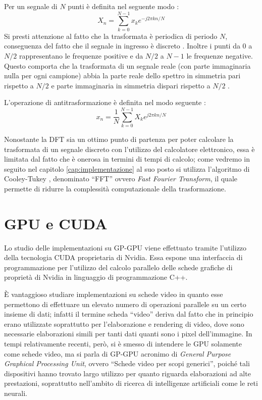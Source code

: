 Per un segnale di $N$ punti è definita nel seguente modo \cite[p.~2.50]{calandrino}:
\begin{equation}
    X_n = \displaystyle\sum_{k=0}^{N-1}x_k e^{-j 2\pi kn/N}
    \label{eq:dft}
\end{equation}
Si presti attenzione al fatto che la trasformata è periodica di periodo $N$, conseguenza del fatto che il segnale in ingresso è discreto \cite[p.~2.30]{calandrino}. Inoltre i punti da $0$ a $N/2$ rappresentano le frequenze positive e da $N/2$ a $N-1$ le frequenze negative. Questo comporta che la trasformata di un segnale reale (con parte immaginaria nulla per ogni campione) abbia la parte reale dello spettro in simmetria pari rispetto a $N/2$ e parte immaginaria in simmetria dispari rispetto a $N/2$ \cite[p.~570]{dspguide}.

L'operazione di antitrasformazione è definita nel modo seguente \cite[p.~2.50]{calandrino}:
\begin{equation}
    x_n = \frac{1}{N}\displaystyle\sum_{k=0}^{N-1}X_k e^{j 2\pi kn/N}
\end{equation}

Nonostante la DFT sia un ottimo punto di partenza per poter calcolare la trasformata di un segnale discreto con l'utilizzo del calcolatore elettronico, essa è limitata dal fatto che è onerosa in termini di tempi di calcolo; come vedremo in seguito nel capitolo \ref{cap:implementazione} al suo posto si utilizza l'algoritmo di Cooley-Tukey \cite{cooleytukey}, denominato ``FFT'' ovvero \textit{Fast Fourier Transform}, il quale permette di ridurre la complessità computazionale della trasformazione.

\section{GPU e CUDA}
Lo studio delle implementazioni su GP-GPU viene effettuato tramite l'utilizzo della tecnologia CUDA proprietaria di Nvidia. Essa espone una interfaccia di programmazione per l'utilizzo del calcolo parallelo delle schede grafiche di proprietà di Nvidia in linguaggio di programmazione C++.

È vantaggioso studiare implementazioni su schede video in quanto esse permettono di effettuare un elevato numero di operazioni parallele su un certo insieme di dati; infatti il termine scheda ``video'' deriva dal fatto che in principio erano utilizzate soprattutto per l'elaborazione e rendering di video, dove sono necessarie elaborazioni simili per tanti dati quanti sono i pixel dell'immagine. In tempi relativamente recenti, però, si è smesso di intendere le GPU solamente come schede video, ma si parla di GP-GPU acronimo di \textit{General Purpose Graphical Processing Unit}, ovvero ``Schede video per scopi generici'', poiché tali dispositivi hanno trovato largo utilizzo per quanto riguarda elaborazioni ad alte prestazioni, soprattutto nell'ambito di ricerca di intelligenze artificiali come le reti neurali.


